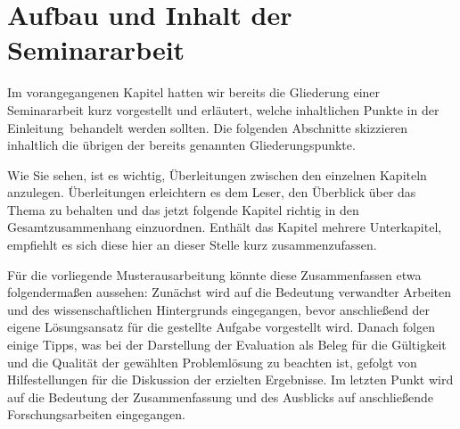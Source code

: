 %
\section{Aufbau und Inhalt der Seminararbeit}
\label{sec_aufbau}

Im vorangegangenen Kapitel hatten wir bereits die Gliederung einer Seminararbeit kurz vorgestellt und erläutert, welche inhaltlichen Punkte in der \glqq Einleitung\grqq\, behandelt werden sollten.
Die folgenden Abschnitte skizzieren inhaltlich die übrigen der bereits genannten Gliederungspunkte.

\smallskip

Wie Sie sehen, ist es wichtig, Überleitungen zwischen den einzelnen Kapiteln anzulegen.
Überleitungen erleichtern es dem Leser, den Überblick über das Thema zu behalten und das jetzt folgende Kapitel richtig in den Gesamtzusammenhang einzuordnen.
Enthält das Kapitel mehrere Unterkapitel, empfiehlt es sich diese hier an dieser Stelle kurz zusammenzufassen.

\smallskip

Für die vorliegende Musterausarbeitung könnte diese Zusammenfassen etwa folgendermaßen aussehen:
Zunächst wird auf die Bedeutung verwandter Arbeiten und des wissenschaftlichen Hintergrunds eingegangen, bevor anschließend der eigene Lösungsansatz für die gestellte Aufgabe vorgestellt wird. 
Danach folgen einige Tipps, was bei der Darstellung der Evaluation als Beleg für die Gültigkeit und die Qualität der gewählten Problemlösung zu beachten ist, gefolgt von Hilfestellungen für die Diskussion der erzielten Ergebnisse.
Im letzten Punkt wird auf die Bedeutung der Zusammenfassung und des Ausblicks auf anschließende Forschungsarbeiten eingegangen.


